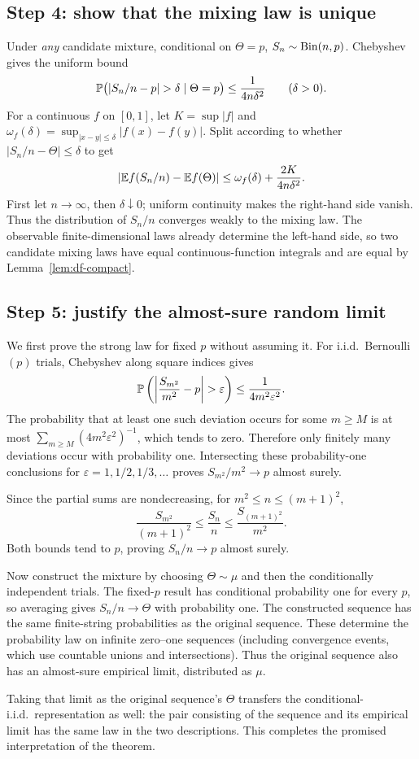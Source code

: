 \subsection*{Step 4: show that the mixing law is unique}
Under \emph{any} candidate mixture, conditional on $\Theta=p$, $S_n\sim\operatorname{Bin}(n,p)$. Chebyshev gives the uniform bound
\[
\P\bigl(|S_n/n-p|>\delta\mid\Theta=p\bigr)
\le\frac{1}{4n\delta^2}\qquad(\delta>0).
\]
For a continuous $f$ on $[0,1]$, let $K=\sup|f|$ and $\omega_f(\delta)=\sup_{|x-y|\le\delta}|f(x)-f(y)|$. Split according to whether $|S_n/n-\Theta|\le\delta$ to get
\[
\left|\mathbb E f(S_n/n)-\mathbb E f(\Theta)\right|
\le \omega_f(\delta)+\frac{2K}{4n\delta^2}.
\]
First let $n\to\infty$, then $\delta\downarrow0$; uniform continuity makes the right-hand side vanish. Thus the distribution of $S_n/n$ converges weakly to the mixing law. The observable finite-dimensional laws already determine the left-hand side, so two candidate mixing laws have equal continuous-function integrals and are equal by Lemma~\ref{lem:df-compact}.

\subsection*{Step 5: justify the almost-sure random limit}
We first prove the strong law for fixed $p$ without assuming it. For i.i.d.\ Bernoulli$(p)$ trials, Chebyshev along square indices gives
\[
\P\left(\left|\frac{S_{m^2}}{m^2}-p\right|>\varepsilon\right)
\le\frac{1}{4m^2\varepsilon^2}.
\]
The probability that at least one such deviation occurs for some $m\ge M$ is at most $\sum_{m\ge M}(4m^2\varepsilon^2)^{-1}$, which tends to zero. Therefore only finitely many deviations occur with probability one. Intersecting these probability-one conclusions for $\varepsilon=1,1/2,1/3,\ldots$ proves $S_{m^2}/m^2\to p$ almost surely.

Since the partial sums are nondecreasing, for $m^2\le n\le(m+1)^2$,
\[
\frac{S_{m^2}}{(m+1)^2}\le\frac{S_n}{n}
\le\frac{S_{(m+1)^2}}{m^2}.
\]
Both bounds tend to $p$, proving $S_n/n\to p$ almost surely.

Now construct the mixture by choosing $\Theta\sim\mu$ and then the conditionally independent trials. The fixed-$p$ result has conditional probability one for every $p$, so averaging gives $S_n/n\to\Theta$ with probability one. The constructed sequence has the same finite-string probabilities as the original sequence. These determine the probability law on infinite zero--one sequences (including convergence events, which use countable unions and intersections). Thus the original sequence also has an almost-sure empirical limit, distributed as $\mu$.

Taking that limit as the original sequence's $\Theta$ transfers the conditional-i.i.d.\ representation as well: the pair consisting of the sequence and its empirical limit has the same law in the two descriptions. This completes the promised interpretation of the theorem.
